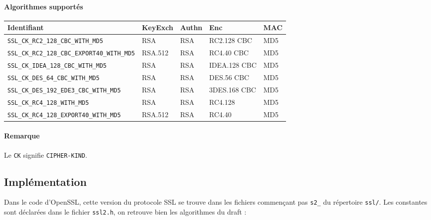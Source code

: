 \documentclass[a4paper,11pt,french]{article}
\begin{document}
\paragraph{Algorithmes supportés} 
\begin{center}
\begin{tabularx}{17cm}{|l|l|l|X|l|}
\hline
\textbf{Identifiant} & \textbf{KeyExch} & \textbf{Authn}& \textbf{Enc}& \textbf{MAC}\\
\hline
\verb+SSL_CK_RC2_128_CBC_WITH_MD5+&RSA&RSA&RC2.128 CBC&MD5\\
\hline
\verb+SSL_CK_RC2_128_CBC_EXPORT40_WITH_MD5+&RSA.512&RSA&RC4.40 CBC&MD5\\
\hline
\verb+SSL_CK_IDEA_128_CBC_WITH_MD5+&RSA&RSA&IDEA.128 CBC&MD5\\
\hline
\verb+SSL_CK_DES_64_CBC_WITH_MD5+&RSA&RSA&DES.56 CBC&MD5\\
\hline
\verb+SSL_CK_DES_192_EDE3_CBC_WITH_MD5+&RSA&RSA&3DES.168 CBC&MD5\\
\hline
\verb+SSL_CK_RC4_128_WITH_MD5+&RSA&RSA&RC4.128&MD5\\
\hline
\verb+SSL_CK_RC4_128_EXPORT40_WITH_MD5+&RSA.512&RSA&RC4.40&MD5\\
\hline
\end{tabularx}
\end{center}

\paragraph{Remarque} Le \verb+CK+ signifie \verb+CIPHER-KIND+.

\subsection{Implémentation}

Dans le code d'OpenSSL, cette version du protocole SSL se trouve dans les fichiers commençant pas \verb+s2_+ du répertoire \verb+ssl/+. Les constantes sont déclarées dans le fichier \verb+ssl2.h+, on retrouve bien les algorithmes du draft :
\end{document}
